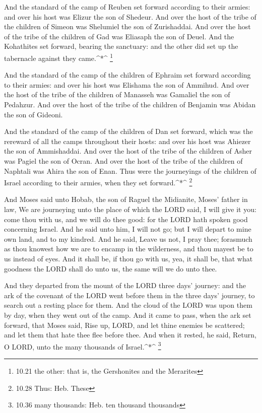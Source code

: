  And the standard of the camp of Reuben set forward
according to their armies: and over his host was Elizur the son of
Shedeur.  And over the host of the tribe of the children of
Simeon was Shelumiel the son of Zurishaddai.  And over the
host of the tribe of the children of Gad was Eliasaph the son of Deuel.
 And the Kohathites set forward, bearing the sanctuary: and
the other did set up the tabernacle against they came.\^{}*\^{}
\footnote{10.21 the other: that is, the Gershonites and the Merarites}

 And the standard of the camp of the children of Ephraim
set forward according to their armies: and over his host was Elishama
the son of Ammihud.  And over the host of the tribe of the
children of Manasseh was Gamaliel the son of Pedahzur.  And
over the host of the tribe of the children of Benjamin was Abidan the
son of Gideoni.

 And the standard of the camp of the children of Dan set
forward, which was the rereward of all the camps throughout their hosts:
and over his host was Ahiezer the son of Ammishaddai.  And
over the host of the tribe of the children of Asher was Pagiel the son
of Ocran.  And over the host of the tribe of the children
of Naphtali was Ahira the son of Enan.  Thus were the
journeyings of the children of Israel according to their armies, when
they set forward.\^{}*\^{} \footnote{10.28 Thus: Heb. These}

 And Moses said unto Hobab, the son of Raguel the
Midianite, Moses' father in law, We are journeying unto the place of
which the LORD said, I will give it you: come thou with us, and we will
do thee good: for the LORD hath spoken good concerning Israel.
 And he said unto him, I will not go; but I will depart to
mine own land, and to my kindred.  And he said, Leave us
not, I pray thee; forasmuch as thou knowest how we are to encamp in the
wilderness, and thou mayest be to us instead of eyes.  And
it shall be, if thou go with us, yea, it shall be, that what goodness
the LORD shall do unto us, the same will we do unto thee.

 And they departed from the mount of the LORD three days'
journey: and the ark of the covenant of the LORD went before them in the
three days' journey, to search out a resting place for them.
 And the cloud of the LORD was upon them by day, when they
went out of the camp.  And it came to pass, when the ark
set forward, that Moses said, Rise up, LORD, and let thine enemies be
scattered; and let them that hate thee flee before thee. 
And when it rested, he said, Return, O LORD, unto the many thousands of
Israel.\^{}*\^{} \footnote{10.36 many thousands: Heb. ten thousand
  thousands}

